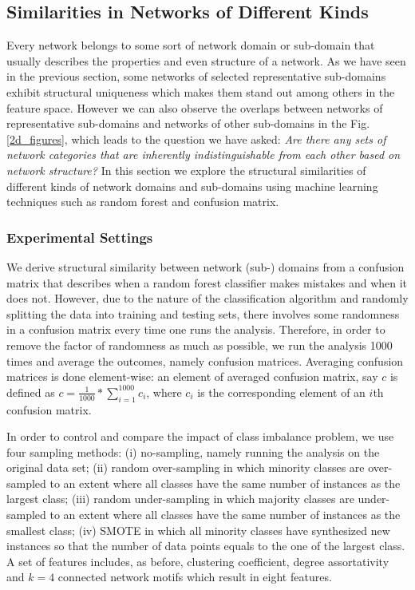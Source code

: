 \documentclass{article}
\begin{document}
\subsection{Similarities in Networks of Different Kinds}
Every network belongs to some sort of network domain or sub-domain that usually describes the properties and even structure of a network. As we have seen in the previous section, some networks of selected representative sub-domains exhibit structural uniqueness which makes them stand out among others in the feature space. However we can also observe the overlaps between networks of representative sub-domains and networks of other sub-domains in the Fig. \ref{2d_figures}, which leads to the question we have asked:  \textit{Are there any sets of network categories that are inherently indistinguishable from each other based on network structure?} In this section we explore the structural similarities of different kinds of network domains and sub-domains using machine learning techniques such as random forest and confusion matrix.  

\subsubsection{Experimental Settings}
We derive structural similarity between network (sub-) domains from a confusion matrix that describes when a random forest classifier makes mistakes and when it does not. However, due to the nature of the classification algorithm and randomly splitting the data into training and testing sets, there involves some randomness in a confusion matrix every time one runs the analysis. Therefore, in order to remove the factor of randomness as much as possible, we run the analysis 1000 times and average the outcomes, namely confusion matrices. Averaging confusion matrices is done element-wise: an element of averaged confusion matrix, say $c$ is defined as $c = \frac{1}{1000}*\sum_{i=1}^{1000} c_i$, where $c_i$ is the corresponding element of an $i$th confusion matrix.

In order to control and compare the impact of class imbalance problem, we use four sampling methods: (i) no-sampling, namely running the analysis on the original data set; (ii) random over-sampling in which minority classes are over-sampled to an extent where all classes have the same number of instances as the largest class; (iii) random under-sampling in which majority classes are under-sampled to an extent where all classes have the same number of instances as the smallest class; (iv) SMOTE in which all minority classes have synthesized new instances so that the number of data points equals to the one of the largest class. A set of features includes, as before, clustering coefficient, degree assortativity and $k = 4$ connected network motifs which result in eight features.
 
\end{document}
